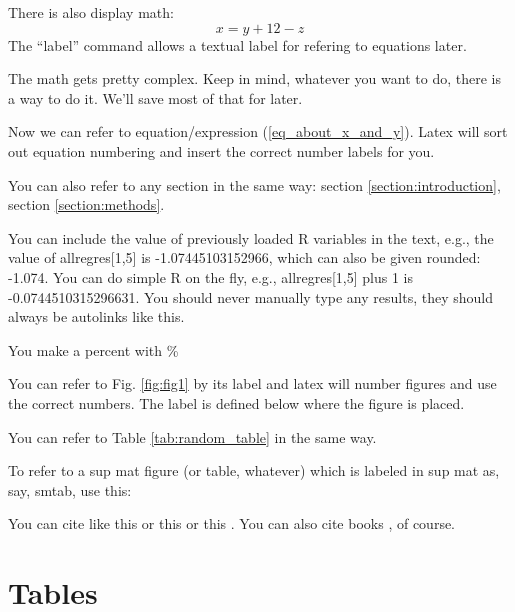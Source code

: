 \documentclass[letterpaper,11pt]{article}
\begin{document}
There is also display math:
  \begin{equation}
x=y+12-z \label{eq_about_x_and_y}
\end{equation}
The ``label'' command allows a textual label for refering to equations later.

The math gets pretty complex. Keep in mind, whatever you want to do, there is a way to do it. We'll save most of that for later.

Now we can refer to equation/expression (\ref{eq_about_x_and_y}). Latex will sort
out equation numbering and insert the correct number labels for you.

You can also refer to any section in the same way: section \ref{section:introduction}, section \ref{section:methods}.

You can include the value of previously loaded R variables in the text, e.g., the value of allregres[1,5] is
-1.07445103152966, which can also be given rounded: -1.074. You can do simple R
on the fly, e.g., allregres[1,5] plus 1 is -0.0744510315296631. 
You should never manually type any results, they should always be autolinks like this.


You make a percent with \%

You can refer to Fig. \ref{fig:fig1} by its label and latex will number figures and use the correct numbers.
The label is defined below where the figure is placed.

You can refer to Table \ref{tab:random_table} in the same way.

To refer to a sup mat figure (or table, whatever) which is labeled in sup mat as, say, smtab, use this: %

You can cite like this \cite{Liebhold2004} or this \citep{Walter2017} or this \citealp{Dut1993}.
You can also cite books \citep{BurnhamAnderson2002}, of course.
\cite{Heino1997}

\clearpage
\newpage




\clearpage
\newpage

\section{Tables}
\end{document}
